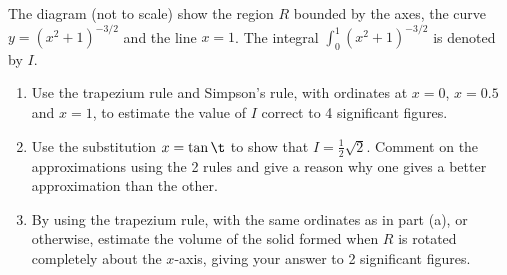 \clearpage
\begin{problem}
    \begin{center}
    \end{center}

    The diagram (not to scale) show the region $R$ bounded by the axes, the curve $y = (x^2 + 1)^{-3/2}$ and the line $x = 1$. The integral $\int_0^1 (x^2 + 1)^{-3/2}$ is denoted by $I$.

    \begin{enumerate}
        \item Use the trapezium rule and Simpson's rule, with ordinates at $x = 0$, $x = 0.5$ and $x = 1$, to estimate the value of $I$ correct to 4 significant figures.
        \item Use the substitution $x = \tan \t$ to show that $I = \frac12 \sqrt{2}$.
        Comment on the approximations using the 2 rules and give a reason why one gives a better approximation than the other.
        \item By using the trapezium rule, with the same ordinates as in part (a), or otherwise, estimate the volume of the solid formed when $R$ is rotated completely about the $x$-axis, giving your answer to 2 significant figures.
    \end{enumerate}
\end{problem}
